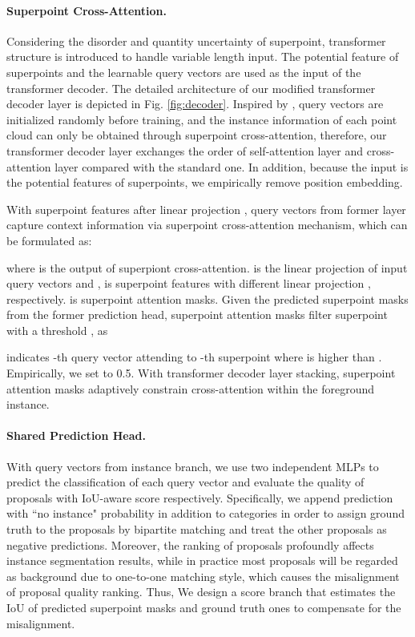 \documentclass[letterpaper]{article} \usepackage{aaai23}  \usepackage{times}  \usepackage{helvet}  \usepackage{courier}  \usepackage[hyphens]{url}  \usepackage{graphicx} \urlstyle{rm} \def\UrlFont{\rm}  \usepackage{natbib}  \usepackage{caption} \frenchspacing  \setlength{\pdfpagewidth}{8.5in}  \setlength{\pdfpageheight}{11in}  \usepackage{algorithm}
\begin{document}
\paragraph{Superpoint Cross-Attention.} Considering the disorder and quantity uncertainty of superpoint, transformer structure is introduced to handle variable length input. The potential feature of superpoints and the learnable query vectors are used as the input of the transformer decoder. The detailed architecture of our modified transformer decoder layer is depicted in Fig. \ref{fig:decoder}. Inspired by \cite{mask2former}, query vectors are initialized randomly before training, and the instance information of each point cloud can only be obtained through superpoint cross-attention, therefore, our transformer decoder layer exchanges the order of self-attention layer and cross-attention layer compared with the standard one\cite{transformer}. In addition, because the input is the potential features of superpoints, we empirically remove position embedding.


With superpoint features after linear projection , query vectors from former layer  capture context information via superpoint cross-attention mechanism, which can be formulated as:

where  is the output of superpiont cross-attention.  is the linear projection of input query vectors  and ,  is superpoint features  with different linear projection ,  respectively.  is superpoint attention masks. Given the predicted superpoint masks  from the former prediction head, superpoint attention masks  filter superpoint with a threshold , as 

 indicates -th query vector attending to -th superpoint where  is higher than . Empirically, we set  to 0.5. With transformer decoder layer stacking, superpoint attention masks  adaptively constrain cross-attention within the foreground instance.

\paragraph{Shared Prediction Head.} With query vectors  from instance branch, we use two independent MLPs to predict the classification  of each query vector and evaluate the quality of proposals with IoU-aware score  respectively. Specifically, we append prediction with ``no instance" probability in addition to  categories in order to assign ground truth to the proposals by bipartite matching and treat the other proposals as negative predictions. Moreover, the ranking of proposals profoundly affects instance segmentation results, while in practice most proposals will be regarded as background due to one-to-one matching style, which causes the misalignment of proposal quality ranking. Thus, We design a score branch that estimates the IoU of predicted superpoint masks and ground truth ones to compensate for the misalignment. 
\end{document}

